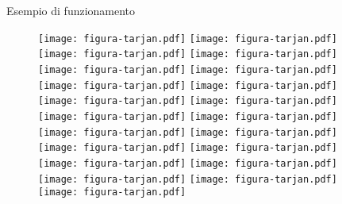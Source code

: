 \begin{frame}{Esempio di funzionamento}
\begin{figure}
\begin{overprint}
\centering\texttt{[image: figura-tarjan.pdf]}
\centering\texttt{[image: figura-tarjan.pdf]}
\centering\texttt{[image: figura-tarjan.pdf]}
\centering\texttt{[image: figura-tarjan.pdf]}
\centering\texttt{[image: figura-tarjan.pdf]}
\centering\texttt{[image: figura-tarjan.pdf]}
\centering\texttt{[image: figura-tarjan.pdf]}
\centering\texttt{[image: figura-tarjan.pdf]}
\centering\texttt{[image: figura-tarjan.pdf]}
\centering\texttt{[image: figura-tarjan.pdf]}
\centering\texttt{[image: figura-tarjan.pdf]}
\centering\texttt{[image: figura-tarjan.pdf]}
\centering\texttt{[image: figura-tarjan.pdf]}
\centering\texttt{[image: figura-tarjan.pdf]}
\centering\texttt{[image: figura-tarjan.pdf]}
\centering\texttt{[image: figura-tarjan.pdf]}
\centering\texttt{[image: figura-tarjan.pdf]}
\centering\texttt{[image: figura-tarjan.pdf]}
\centering\texttt{[image: figura-tarjan.pdf]}
\centering\texttt{[image: figura-tarjan.pdf]}
\centering\texttt{[image: figura-tarjan.pdf]}
\end{overprint}
\end{figure}
	
\end{frame}	








